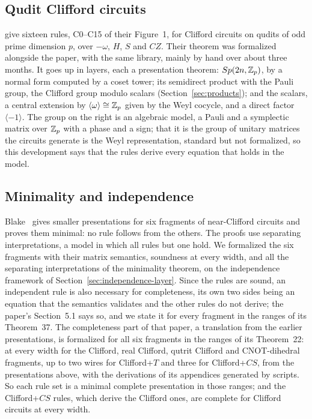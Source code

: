 \subsection{Qudit Clifford circuits}\label{sec:qupit}

\citet{bian2026qupit} give sixteen rules, C0--C15 of their Figure~1,
for Clifford circuits on qudits of odd prime dimension $p$, over
$-\omega$, $H$, $S$ and $CZ$. Their theorem was formalized alongside the
paper, with the same library, mainly by hand over about three months.
It goes up in layers, each a presentation theorem: $Sp(2n,\mathbb{Z}_p)$, by a
normal form computed by a coset tower; its semidirect product with the
Pauli group, the Clifford group modulo scalars
(Section~\ref{sec:products}); and the scalars, a central extension by
$\langle\omega\rangle\cong\mathbb{Z}_p$ given by the Weyl cocycle, and a direct
factor $\langle -1\rangle$. The group on the right is an algebraic
model, a Pauli and a symplectic matrix over $\mathbb{Z}_p$ with a phase and a
sign; that it is the group of unitary matrices the circuits generate
is the Weyl representation, standard but not formalized, so this
development says that the rules derive every equation that holds in the
model.

\subsection{Minimality and independence}\label{sec:structural}

Blake~\cite{blake2026simpler} gives smaller presentations for six
fragments of near-Clifford circuits and proves them minimal: no rule
follows from the others. The proofs use separating interpretations, a
model in which all rules but one hold. We formalized the six fragments
with their matrix semantics, soundness at every width, and all the
separating interpretations of the minimality theorem, on the
independence framework of Section~\ref{sec:independence-layer}. Since
the rules are sound, an independent rule is also necessary for
completeness, its own two sides being an equation that the semantics
validates and the other rules do not derive; the paper's Section~5.1
says so, and we state it for every fragment in the ranges of its
Theorem~37. The completeness part of that paper, a translation from
the earlier presentations, is formalized for all six fragments in the
ranges of its Theorem~22: at every width for the Clifford, real
Clifford, qutrit Clifford and CNOT-dihedral fragments, up to two wires
for Clifford+$T$ and three for Clifford+$CS$, from the presentations
above, with the derivations of its appendices generated by scripts.
So each rule set is a minimal complete presentation in those ranges;
and the Clifford+$CS$ rules, which derive the Clifford ones, are
complete for Clifford circuits at every width.
